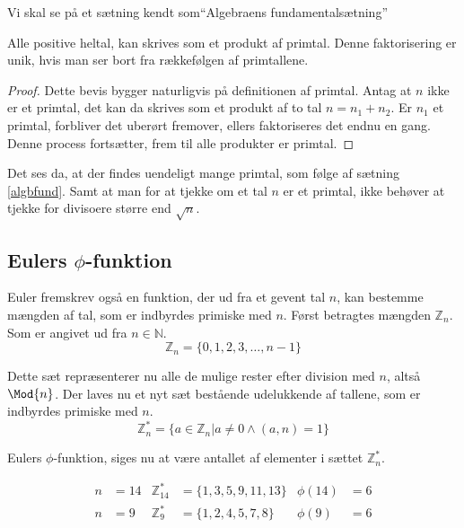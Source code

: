 %


Vi skal se på et sætning kendt som``Algebraens fundamentalsætning''
\begin{sent}%
    Alle positive heltal, kan skrives som et produkt af primtal.
    Denne faktorisering er unik, hvis man ser bort fra rækkefølgen af primtallene.
    \label{algbfund}
\end{sent}

\begin{proof}
    Dette bevis bygger naturligvis på definitionen af primtal.
    Antag at \(n\) ikke er et primtal, det kan da skrives som et produkt af to tal \(n = n_1 + n_2\).
    Er \(n_1\) et primtal, forbliver det uberørt fremover, ellers faktoriseres det endnu en gang.
    Denne process fortsætter, frem til alle produkter er primtal.
\end{proof}

Det ses da, at der findes uendeligt mange primtal, som følge af sætning \ref{algbfund}.
Samt at man for at tjekke om et tal \(n\) er et primtal, ikke behøver at tjekke for divisoere større end \(\sqrt{n}\).


\subsection{Eulers \texorpdfstring{\(\phi\)}{Lg}-funktion}
Euler fremskrev også en funktion, der ud fra et gevent tal \(n\), kan bestemme mængden af tal, som er indbyrdes primiske med \(n\).
Først betragtes mængden \(\mathbb{Z}_n\). Som er angivet ud fra \(n \in \mathbb{N}\).
\[\mathbb{Z}_n = \{0, 1, 2, 3, \hdots, n-1 \}\]

Dette sæt repræsenterer nu alle de mulige rester efter division med \(n\), altså \(\Mod{n}\).
Der laves nu et nyt sæt bestående udelukkende af tallene, som er indbyrdes primiske med \(n\).
\[\mathbb{Z}_n^* = \{a \in \mathbb{Z}_n | a \neq 0 \land (a, n) = 1\}\]

\begin{definition}
    Eulers \(\phi\)-funktion, siges nu at være antallet af elementer i sættet \(\mathbb{Z}_n^*\).
\end{definition}

\begin{eks}
    \mbox{}\vspace*{-1.5em}
    \begin{align*}
        n &= 14 & \mathbb{Z}_{14}^*  &= \{1, 3, 5, 9, 11, 13 \} & \phi(14) &= 6\\
        n &= 9  & \mathbb{Z}_9^*     &= \{1, 2, 4, 5, 7, 8\}    & \phi(9)  &= 6
    \end{align*}
\end{eks}

